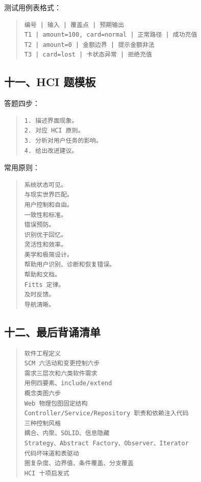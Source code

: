 \documentclass[UTF8,zihao=-4]{ctexart}
\begin{document}
测试用例表格式：


\begin{quote}
\footnotesize
\begin{verbatim}
编号 | 输入 | 覆盖点 | 预期输出
T1 | amount=100, card=normal | 正常路径 | 成功充值
T2 | amount=0 | 金额边界 | 提示金额非法
T3 | card=lost | 卡状态异常 | 拒绝充值
\end{verbatim}
\end{quote}


\subsection{十一、HCI 题模板}


答题四步：


\begin{quote}
\footnotesize
\begin{verbatim}
1. 描述界面现象。
2. 对应 HCI 原则。
3. 分析对用户任务的影响。
4. 给出改进建议。
\end{verbatim}
\end{quote}


常用原则：


\begin{quote}
\footnotesize
\begin{verbatim}
系统状态可见。
与现实世界匹配。
用户控制和自由。
一致性和标准。
错误预防。
识别优于回忆。
灵活性和效率。
美学和极简设计。
帮助用户识别、诊断和恢复错误。
帮助和文档。
Fitts 定律。
及时反馈。
导航清晰。
\end{verbatim}
\end{quote}


\subsection{十二、最后背诵清单}


\begin{quote}
\footnotesize
\begin{verbatim}
软件工程定义
SCM 六活动和变更控制六步
需求三层次和六类软件需求
用例四要素、include/extend
概念类图六步
Web 物理包图固定结构
Controller/Service/Repository 职责和依赖注入代码
三种控制风格
耦合、内聚、SOLID、信息隐藏
Strategy、Abstract Factory、Observer、Iterator
代码坏味道和表驱动
圈复杂度、边界值、条件覆盖、分支覆盖
HCI 十项启发式
\end{verbatim}
\end{quote}
\end{document}
